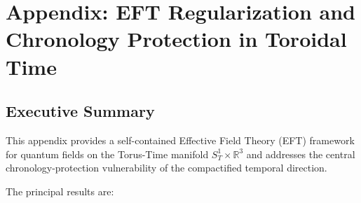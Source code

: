 \documentclass[12pt,openany]{book}
\theoremstyle{plain}
\theoremstyle{definition}
\theoremstyle{remark}
\providecommand{\SoneR}{S^{1}_{T}\!\times\!\mathbb{R}^{3}}
\begin{document}

\chapter{Appendix: EFT Regularization and Chronology Protection in Toroidal Time}
\label{app:EFT}


\section*{Executive Summary}
\label{sec:eft-exec-summary}

This appendix provides a self-contained Effective Field Theory (EFT)
framework for quantum fields on the Torus-Time manifold
$\SoneR$ and addresses the central chronology-protection
vulnerability of the compactified temporal direction.

The principal results are:
\end{document}
